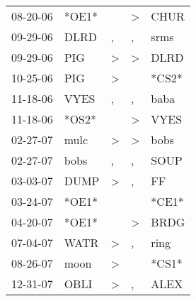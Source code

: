 \begin{supertabular}{p{0.07\textwidth}p{0.06\textwidth}p{0.02\textwidth}p{0.02\textwidth}p{0.06\textwidth}}
          08-20-06\textsuperscript{} &                            *OE1* &                  &     \textgreater &           CHUR\textsuperscript{} \\
          09-29-06\textsuperscript{} &           DLRD\textsuperscript{} &                , &                , &           srms\textsuperscript{} \\
          09-29-06\textsuperscript{} &            PIG\textsuperscript{} &     \textgreater &     \textgreater &           DLRD\textsuperscript{} \\
          10-25-06\textsuperscript{} &            PIG\textsuperscript{} &     \textgreater &                  &                            *CS2* \\
          11-18-06\textsuperscript{} &           VYES\textsuperscript{} &                , &                , &           baba\textsuperscript{} \\
          11-18-06\textsuperscript{} &                            *OS2* &                  &     \textgreater &           VYES\textsuperscript{} \\
          02-27-07\textsuperscript{} &           mulc\textsuperscript{} &     \textgreater &     \textgreater &           bobs\textsuperscript{} \\
          02-27-07\textsuperscript{} &           bobs\textsuperscript{} &                , &                , &           SOUP\textsuperscript{} \\
          03-03-07\textsuperscript{} &           DUMP\textsuperscript{} &     \textgreater &                , &             FF\textsuperscript{} \\
          03-24-07\textsuperscript{} &                            *OE1* &                  &                  &                            *CE1* \\
          04-20-07\textsuperscript{} &                            *OE1* &                  &     \textgreater &           BRDG\textsuperscript{} \\
          07-04-07\textsuperscript{} &           WATR\textsuperscript{} &     \textgreater &                , &           ring\textsuperscript{} \\
          08-26-07\textsuperscript{} &           moon\textsuperscript{} &     \textgreater &                  &                            *CS1* \\
          12-31-07\textsuperscript{} &           OBLI\textsuperscript{} &     \textgreater &                , &           ALEX\textsuperscript{} \\

\end{supertabular}
